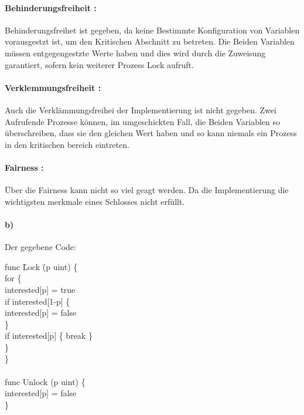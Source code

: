 \paragraph{ Behinderungsfreiheit : }

Behinderungsfreihet ist gegeben, da keine Bestimmte Konfiguration von Variablen vorausgestzt ist, um den Kritischen Abschnitt zu betreten. Die Beiden Variablen müssen entgegengestzte Werte haben und dies wird durch die Zuweisung garantiert, sofern kein weiterer Prozess Lock aufruft.

\paragraph{ Verklemmungsfreiheit : }

Auch die Verklämmungsfreihei der Implementierung ist nicht gegeben. Zwei Aufrufende Prozesse können, im umgeschickten Fall, die Beiden Variablen so überschreiben, dass sie den gleichen Wert haben und so kann niemals ein Prozess in den kritischen bereich eintreten.

\paragraph{ Fairness : } Über die Fairness kann nicht so viel geagt werden. Da die Implementierung die wichtigsten merkmale eines Schlosses nicht erfüllt.

\newpage

\paragraph{ b) }	

Der gegebene Code:

\begin{mylisting}
\begin{tabbing}

func \= Lock \= (p uint) \{  \\
\>	for \{ \>  \\
\>	\>	interested[p] = true  \\
\>	\>	if  \= interested[1-p] \{   \\
\>	\>	\>	interested[p] = false \\
\>	\>	\} \\
\>	\>	if interested[p] \{ break \} \\
\>	\} \> \\
\}\> \> \\

\\ 
func Unlock (p uint) \{ \> \> \\
\>	interested[p] = false \> \\
\} \> \> \\
\end{tabbing} 
\end{mylisting}

